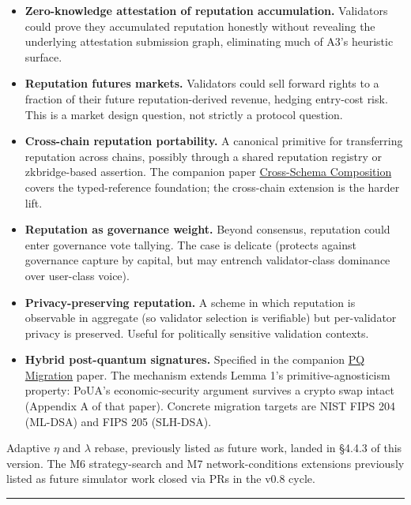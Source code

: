 \documentclass[
  11pt,
]{article}
\providecommand{\tightlist}{%
  \setlength{\itemsep}{0pt}\setlength{\parskip}{0pt}}
\begin{document}
\begin{itemize}
\tightlist
\item
  \textbf{Zero-knowledge attestation of reputation accumulation.}
  Validators could prove they accumulated reputation honestly without
  revealing the underlying attestation submission graph, eliminating
  much of A3's heuristic surface.
\item
  \textbf{Reputation futures markets.} Validators could sell forward
  rights to a fraction of their future reputation-derived revenue,
  hedging entry-cost risk. This is a market design question, not
  strictly a protocol question.
\item
  \textbf{Cross-chain reputation portability.} A canonical primitive for
  transferring reputation across chains, possibly through a shared
  reputation registry or zkbridge-based assertion. The companion paper
  \href{https://github.com/ligate-io/ligate-research/tree/main/papers/cross-schema-composition}{Cross-Schema
  Composition} covers the typed-reference foundation; the cross-chain
  extension is the harder lift.
\item
  \textbf{Reputation as governance weight.} Beyond consensus, reputation
  could enter governance vote tallying. The case is delicate (protects
  against governance capture by capital, but may entrench
  validator-class dominance over user-class voice).
\item
  \textbf{Privacy-preserving reputation.} A scheme in which reputation
  is observable in aggregate (so validator selection is verifiable) but
  per-validator privacy is preserved. Useful for politically sensitive
  validation contexts.
\item
  \textbf{Hybrid post-quantum signatures.} Specified in the companion
  \href{https://github.com/ligate-io/ligate-research/tree/main/papers/pq-migration}{PQ Migration}
  paper. The mechanism extends Lemma 1's primitive-agnosticism property:
  PoUA's economic-security argument survives a crypto swap intact
  (Appendix A of that paper). Concrete migration targets are NIST FIPS 204
  (ML-DSA) and FIPS 205 (SLH-DSA).
\end{itemize}

Adaptive \(\eta\) and \(\lambda\) rebase, previously listed as future
work, landed in §4.4.3 of this version. The M6 strategy-search and M7
network-conditions extensions previously listed as future simulator work
closed via PRs in the v0.8 cycle.

\begin{center}\rule{0.5\linewidth}{0.5pt}\end{center}
\end{document}
